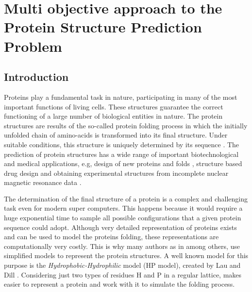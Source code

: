 


\chapter{Multi objective approach to the Protein Structure Prediction Problem}


\section{Introduction} \label{sec:intro}


Proteins play a fundamental task in nature, participating in many of the most important functions of living cells. These structures guarantee the correct functioning of a large number of biological entities in nature. The protein structures are results of the so-called protein folding process in which the initially unfolded chain of amino-acids is transformed into its final structure. Under suitable conditions, this structure is uniquely determined by its sequence \cite{santana2004protein}. The prediction of protein structures has a wide range of important biotechnological and medical applications, e.g, design of new proteins and folds \cite{rothlisberger2008kemp, wang2012structural}, structure based drug design \cite{qian2004improvement, krieger2009improving} and obtaining experimental structures from incomplete nuclear magnetic resonance data \cite{shen2009novo, raman2009accurate}.


The determination of the final structure of a protein is a complex and challenging task even for modern super computers. This happens because  it would require a huge exponential time to sample all possible configurations that a given protein sequence could adopt. Although very detailed representation of proteins exists and can be used to model the proteins folding, these representations are computationally very costly. This is why many authors as in \cite{custodio2004investigation, hsu2003growth, krasnogor2002multimeme, lin2011protein, unger1993genetic} among others, use simplified models to represent the protein structures. A well known model for this purpose is the \textit{Hydrophobic-Hydrophilic} model (HP model), created by Lau and Dill \cite{lau1989lattice}. Considering just two types of residues H and P in a regular lattice, makes easier to represent a protein and work with it to simulate the folding process.


